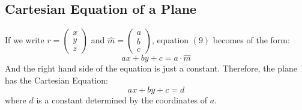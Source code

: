 \documentclass[hidelinks, a4paper, 12pt]{article}
\newcommand{\mhat}{\hat{m}}
\begin{document}
        \subsection{Cartesian Equation of a Plane}
            If we write $r = \begin{pmatrix}x\\y\\z\end{pmatrix}$ and $\mhat = \begin{pmatrix}a\\b\\c\end{pmatrix}$, equation $(9)$ becomes of the form:
            \[ax + by + c = a\cdot\mhat\]
            And the right hand side of the equation is just a constant. Therefore, the plane has the Cartesian Equation:
            \[ax + by + c = d\]
            where $d$ is a constant determined by the coordinates of $a$.
\end{document}
